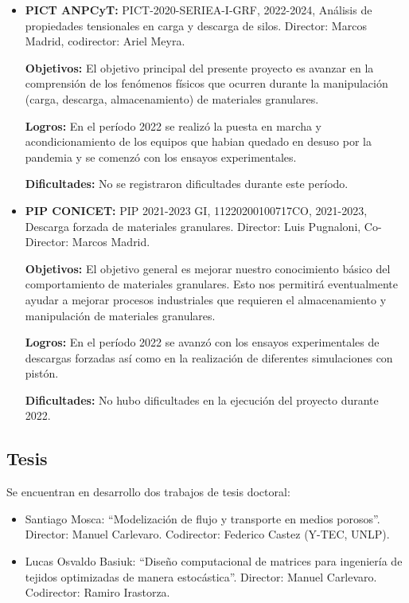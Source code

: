 \documentclass[a4paper,11pt,twoside,final,titlepage,onecolumn,openright]{report}
\begin{document}
\begin{itemize}
\item \textbf{PICT ANPCyT:} PICT-2020-SERIEA-I-GRF, 2022-2024, Análisis de propiedades tensionales en carga y descarga de silos. Director: Marcos Madrid, codirector: Ariel Meyra.

    \textbf{Objetivos:} El objetivo principal del presente proyecto es avanzar en la comprensión de los fenómenos físicos que ocurren durante la manipulación (carga, descarga, almacenamiento) de materiales granulares. 

    \textbf{Logros:} En el período 2022 se realizó la puesta en marcha y acondicionamiento de los equipos que habian quedado en desuso por la pandemia y se comenzó con los ensayos experimentales.

    \textbf{Dificultades:} No se registraron dificultades durante este período.

\item \textbf{PIP CONICET:} PIP 2021-2023 GI, 11220200100717CO, 2021-2023, Descarga forzada de materiales granulares. Director: Luis Pugnaloni, Co-Director: Marcos Madrid.

    \textbf{Objetivos:} El objetivo general es mejorar nuestro conocimiento básico del comportamiento de materiales granulares. Esto nos permitirá eventualmente ayudar a mejorar procesos industriales que requieren el almacenamiento y manipulación de materiales granulares.

    \textbf{Logros:} En el período 2022 se avanzó con los ensayos experimentales de descargas forzadas así como en la realización de diferentes simulaciones con pistón.

    \textbf{Dificultades:} No hubo dificultades en la ejecución del proyecto durante 2022.

\end{itemize}

\subsection{Tesis}

Se encuentran en desarrollo dos trabajos de tesis doctoral:
\begin{itemize}
 \item Santiago Mosca: ``Modelización de flujo y transporte en medios porosos''. Director: Manuel Carlevaro. Codirector: Federico Castez (Y-TEC, UNLP).
 \item Lucas Osvaldo Basiuk: ``Diseño computacional de matrices para ingeniería de tejidos optimizadas de manera estocástica''. Director: Manuel Carlevaro. Codirector: Ramiro Irastorza.
\end{itemize}
\end{document}
